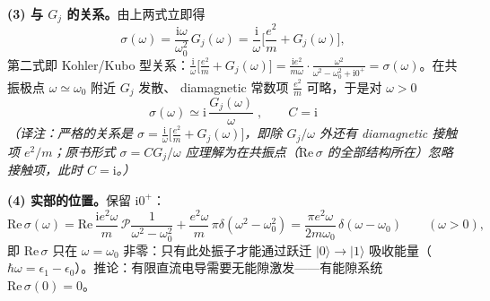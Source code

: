 \textbf{(3) 与 $G_j$ 的关系。}由上两式立即得
\begin{equation*}
\sigma(\omega)=\frac{\mathrm{i}\omega}{\omega_0^2}\,G_j(\omega)
=\frac{\mathrm{i}}{\omega}\Big[\frac{e^2}{m}+G_j(\omega)\Big],
\end{equation*}
第二式即 Kohler/Kubo 型关系：$\frac{\mathrm{i}}{\omega}\big[\frac{e^2}m+G_j(\omega)\big]=\frac{\mathrm{i}e^2}{m\omega}\cdot\frac{\omega^2}{\omega^2-\omega_0^2+\mathrm{i}0^+}=\sigma(\omega)$。在共振极点 $\omega\simeq\omega_0$ 附近 $G_j$ 发散、 diamagnetic 常数项 $\frac{e^2}m$ 可略，于是对 $\omega>0$
\begin{equation*}
\boxed{\;\sigma(\omega)\simeq \mathrm{i}\,\frac{G_j(\omega)}{\omega}\;,\qquad C=\mathrm{i}\;}
\end{equation*}
\emph{（译注：严格的关系是 $\sigma=\frac{\mathrm{i}}{\omega}\big[\frac{e^2}{m}+G_j(\omega)\big]$，即除 $G_j/\omega$ 外还有 diamagnetic 接触项 $e^2/m$；原书形式 $\sigma=CG_j/\omega$ 应理解为在共振点（$\mathrm{Re}\,\sigma$ 的全部结构所在）忽略接触项，此时 $C=\mathrm{i}$。）}

\textbf{(4) 实部的位置。}保留 $\mathrm{i}0^+$：
\begin{equation*}
\mathrm{Re}\,\sigma(\omega)=\mathrm{Re}\,\frac{\mathrm{i}e^2\omega}{m}\,\mathcal P\frac1{\omega^2-\omega_0^2}
+\frac{e^2\omega}{m}\,\pi\delta(\omega^2-\omega_0^2)
=\frac{\pi e^2\omega}{2m\omega_0}\,\delta(\omega-\omega_0)\qquad(\omega>0),
\end{equation*}
即 $\mathrm{Re}\,\sigma$ 只在 $\omega=\omega_0$ 非零：只有此处振子才能通过跃迁 $|0\rangle\to|1\rangle$ 吸收能量（$\hbar\omega=\epsilon_1-\epsilon_0$）。推论：有限直流电导需要无能隙激发——有能隙系统 $\mathrm{Re}\,\sigma(0)=0$。

